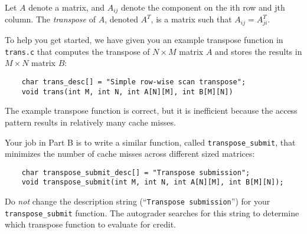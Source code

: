\documentclass[11pt]{article}
\begin{document}
Let $A$ denote a matrix, and $A_{ij}$ denote the component on the ith
row and jth column. The {\em transpose} of $A$, denoted $A^T$, is a matrix
such that $A_{ij}=A^T_{ji}$.

To help you get started, we have given you an example
transpose function in {\tt trans.c} that
computes the transpose of $N \times M$ matrix $A$ and stores the
results in $M \times N$ matrix $B$:
\begin{verbatim}
    char trans_desc[] = "Simple row-wise scan transpose";
    void trans(int M, int N, int A[N][M], int B[M][N])
\end{verbatim}
The example transpose function is correct, but it is inefficient
because the access pattern results in relatively many cache misses.

Your job in Part B is to write a similar function, called
\verb+transpose_submit+, that minimizes the number of cache misses
across different sized matrices:
\begin{verbatim}
    char transpose_submit_desc[] = "Transpose submission";
    void transpose_submit(int M, int N, int A[N][M], int B[M][N]);
\end{verbatim}
Do {\em not} change the description string
(``\verb:Transpose submission:'') for your \verb:transpose_submit:
function.  The autograder searches for this string to determine which
transpose function to evaluate for credit.
\end{document}
